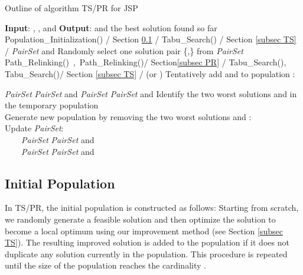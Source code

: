 \documentclass[authoryear,12pt]{elsarticle}
\begin{document}
\begin{algorithm}[!hp]
\begin{scriptsize}
 \caption{Outline of algorithm TS/PR for JSP}\label{algorithm_outline}
 \begin{algorithmic}[1]
   \STATE \sf \textbf{Input}: , , and 
   \STATE \textbf{Output}:  and the best solution  found so far
   \STATE  
   Population\_Initialization() \hfill / Section \ref{subsec initial} /
   \FOR{}
       \STATE   Tabu\_Search() \hfill / Section \ref{subsec TS} /
   \ENDFOR
   \STATE 
   \STATE \textsl{PairSet}    and 
   \REPEAT
        \STATE Randomly select one solution pair \{,\} from \textsl{PairSet}
        \STATE   Path\_Relinking()\ ,\   Path\_Relinking()\hfill / Section\ref{subsec PR} /
        \STATE   Tabu\_Search(),   Tabu\_Search()\hfill / Section \ref{subsec TS}
        /
           \STATE (or )
        \ENDIF
\STATE Tentatively add  and  to population :
        
\STATE \textsl{PairSet}  \textsl{PairSet}  and 
        \STATE \textsl{PairSet}  \textsl{PairSet}  and 
        \STATE Identify the two worst solutions  and  in the temporary population \\
\STATE Generate new population by removing the two worst solutions  and :\\
        
        \STATE Update \textsl{PairSet}:\\
          \ \ \ \ \textsl{PairSet}  \textsl{PairSet}  and \\
          \ \ \ \ \textsl{PairSet}  \textsl{PairSet}  and 
 \end{algorithmic}
 \end{scriptsize}
\end{algorithm}

\subsection{Initial Population}
\label{subsec initial}

 In TS/PR, the initial population is constructed as follows: Starting from scratch, we randomly generate a feasible solution and then optimize the solution to become a local optimum using our improvement method (see Section \ref{subsec TS}). The resulting improved solution is added to the population if it does not duplicate any solution currently in  the population. This procedure is repeated until the size of  the population
reaches the cardinality .
\end{document}
